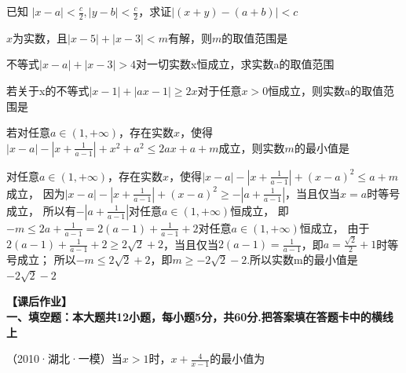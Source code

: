 \par
\begin{problem}
    已知 $\displaystyle |x-a|<\frac{c}{2},|y-b|<\frac{c}{2}$，求证$|(x+y)-(a+b)|<c$ 
\end{problem}

\par
\begin{problem}
    $x$为实数，且$|x-5|+|x-3|<m$有解，则$m$的取值范围是
\end{problem}

\par
\begin{problem}
    不等式$|x-a|+|x-3|>4$对一切实数x恒成立，求实数a的取值范围
\end{problem}

\par
\begin{problem}
    若关于x的不等式$|x-1|+|ax-1|\ge2x$对于任意$x>0$恒成立，则实数a的取值范围是\tiankong{$(-\infty,-1]\cup[3,+\infty)$} 
\end{problem}

\par
\begin{problem}
    若对任意$a\in(1,+\infty)$，存在实数$x$，使得$\displaystyle |x-a|-|x+\frac{1}{a-1}|+x^2+a^2\le 2ax+a+m$成立，则实数$m$的最小值是
    \begin{jiexi}
        对任意$a\in(1,+\infty)$，存在实数$x$，使得$\displaystyle |x-a|-|x+\frac{1}{a-1}|+(x-a)^2\le a+m$成立，
因为$\displaystyle |x-a|-|x+\frac{1}{a-1}|+(x-a)^2\ge -|a+\frac{1}{a-1}|$，当且仅当$x=a$时等号成立，
所以有$-|a+\frac{1}{a-1}|$对任意$a\in(1,+\infty)$恒成立，
即$\displaystyle -m\le 2a+\frac{1}{a-1}=2(a-1)+\frac{1}{a-1}+2$对任意$a\in(1,+\infty)$恒成立，
由于$\displaystyle 2(a-1)+\frac{1}{a-1}+2\ge 2\sqrt{2}+2$，当且仅当$\displaystyle 2(a-1)=\frac{1}{a-1}$，即$\displaystyle a=\frac{\sqrt{2}}{2}+1$时等号成立；
所以$-m\le2\sqrt{2}+2$，即$m\ge -2\sqrt{2}-2$.所以实数m的最小值是$-2\sqrt{2}-2$
    \end{jiexi}
\end{problem}

\clearpage
\textbf{【课后作业】}\\
\textbf{一、填空题：本大题共12小题，每小题5分，共60分.把答案填在答题卡中的横线上}

\begin{hmwk}
    （2010·湖北·一模）当$x>1$时，$\displaystyle x+\frac{4}{x-1}$的最小值为
\end{hmwk}

